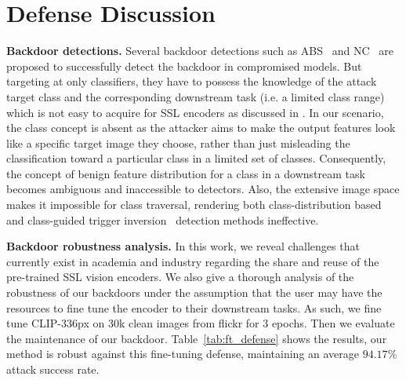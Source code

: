 \clearpage
\setcounter{page}{1}
\maketitlesupplementary

\section{Defense Discussion}
\label{appendix:defense_discussion}
\textbf{Backdoor detections.} Several backdoor detections such as ABS~\cite{liu2019abs} and NC~\cite{wang2019neural} are proposed to successfully detect the backdoor in compromised models. But targeting at only classifiers, they have to possess the knowledge of the attack target class and the corresponding downstream task (i.e. a limited class range) which is not easy to acquire for SSL encoders as discussed in \cite{feng2023detecting}. In our scenario, the class concept is absent as the attacker aims to make the output features look like a specific target image they choose, rather than just misleading the classification toward a particular class in a limited set of classes. Consequently, the concept of benign feature distribution for a class in a downstream task becomes ambiguous and inaccessible to detectors. Also, the extensive image space makes it impossible for class traversal, rendering both class-distribution based~\cite{ma2022beatrix} and class-guided trigger inversion~\cite{liu2019abs,wang2019neural} detection methods ineffective.

\noindent\textbf{Backdoor robustness analysis.} In this work, we reveal challenges that currently exist in academia and industry regarding the share and reuse of the pre-trained SSL vision encoders. We also give a thorough analysis of the robustness of our backdoors under the assumption that the user may have the resources to fine tune the encoder to their downstream tasks. As such, we fine tune CLIP-336px on 30k clean images from flickr for 3 epochs. Then we evaluate the maintenance of our backdoor. Table~\ref{tab:ft_defense} shows the results, our method is robust against this fine-tuning defense, maintaining an average $94.17\%$ attack success rate.
\begin{table}[h]
    \centering
    \caption{Attack efficacy on CLIP under fine-tuning (FT) defense (fine tuned on 30k clean images from flickr for 3 epochs). Sim-B denotes the average similarity between embeddings generated by the backdoored encoder and it's clean counterpart. ASR denotes attack success rate. Detailed definitions of metrics are in \S\ref{sec:exp_setting}.}
    \label{tab:ft_defense}
\end{table}
